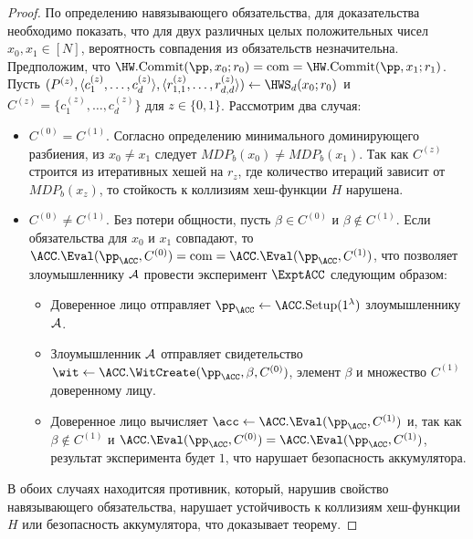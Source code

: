 \begin{proof}
	По определению навязывающего обязательства, для доказательства необходимо показать, что для двух различных целых положительных чисел $x_0, x_1 \in [N]$, вероятность совпадения из обязательств незначительна.
	Предположим, что $\HW.\Commit(\pp, x_0; r_0) = \com = \HW.\Commit(\pp, x_1; r_1)$.
	Пусть $(P^{(z)}, \langle c_1^{(z)}, \dots, c_d^{(z)} \rangle, \langle r_{1, 1}^{(z)}, \dots, r_{d, d}^{(z)} \rangle) \leftarrow \HWS_d(x_0; r_0)$ и $C^{(z)} = \{c_1^{(z)}, \dots, c_d^{(z)}\}$ для $z \in \{0, 1\}$.
	Рассмотрим два случая:
	\begin{itemize}
		\item $C^{(0)} = C^{(1)}$. Согласно определению минимального доминирующего разбиения, из $x_0 \neq x_1$ следует $MDP_b(x_0) \neq MDP_b(x_1)$. Так как $C^{(z)}$ строится из итеративных хешей на $r_z$, где количество итераций зависит от $MDP_b(x_z)$, то стойкость к коллизиям хеш-функции $H$ нарушена.
		\item $C^{(0)} \neq C^{(1)}$. Без потери общности, пусть $\beta \in C^{(0)}$ и $\beta \notin C^{(1)}$. Если обязательства для $x_0$ и $x_1$ совпадают, то $\ACC.\Eval(\pp_\ACC, C^{(0)}) = \com = \ACC.\Eval(\pp_\ACC, C^{(1)})$, что позволяет злоумышленнику $\mathcal{A}$ провести эксперимент $\ExptACC$ следующим образом:
		\begin{itemize}
			\item Доверенное лицо отправляет $\pp_\ACC \leftarrow \ACC.\Setup(1^\lambda)$ злоумышленнику $\mathcal{A}$.
			\item Злоумышленник $\mathcal{A}$ отправляет свидетельство $\wit \leftarrow \ACC.\WitCreate(\pp_\ACC, \beta, C^{(0)})$, элемент $\beta$ и множество $C^{(1)}$ доверенному лицу.
			\item Доверенное лицо вычисляет $\acc \leftarrow \ACC.\Eval(\pp_\ACC, C^{(1)})$ и, так как $\beta \notin C^{(1)}$ и $\ACC.\Eval(\pp_\ACC, C^{(0)}) = \ACC.\Eval(\pp_\ACC, C^{(1)})$, результат эксперимента будет $1$, что нарушает безопасность аккумулятора.
		\end{itemize}
	\end{itemize}
	В обоих случаях находитсяя противник, который, нарушив свойство навязывающего обязательства, нарушает устойчивость к коллизиям хеш-функции $H$ или безопасность аккумулятора, что доказывает теорему.
\end{proof}

